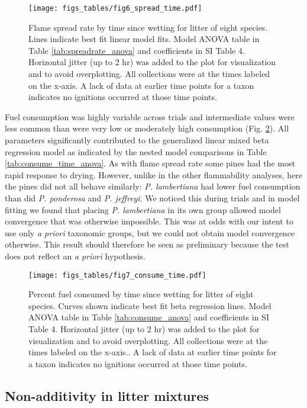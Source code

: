 \documentclass[letterpaper,12pt]{article}
\begin{document}
\begin{figure}[h]
  \centering
\texttt{[image: figs\_tables/fig6\_spread\_time.pdf]}
\caption{Flame spread rate by time since wetting for litter of eight species.
  Lines indicate best fit linear model fits. Model ANOVA table in Table
  \ref{tab:spreadrate_anova} and coefficients in SI Table 4. Horizontal jitter
  (up to 2 hr) was added to the plot for visualization and to avoid
  overplotting. All collections were at the times labeled on the x-axis. A lack
  of data at earlier time points for a taxon indicates no ignitions occurred at
  those time points.}
\label{fig:spread_time}
\end{figure}

Fuel consumption was highly variable across trials and intermediate values were
less common than were very low or moderately high consumption (Fig.
\ref{fig:consume_time}). All parameters significantly contributed to the
generalized linear mixed beta regression model as indicated by the nested model
comparisons in Table \ref{tab:consume_time_anova}. As with flame spread rate
some pines had the most rapid response to drying. However, unlike in the other
flammability analyses, here the pines did not all behave similarly: \emph{P.
  lambertiana} had lower fuel consumption than did \emph{P. ponderosa} and
\emph{P. jeffreyi}. We noticed this during trials and in model fitting we
found that placing \emph{P. lambertiana} in its own group allowed model
convergence that was otherwise impossible. This was at odds with our intent to
use only \emph{a priori} taxonomic groups, but we could not obtain model
convergence otherwise. This result should therefore be seen as preliminary
because the test does not reflect an \emph{a priori} hypothesis.


\begin{figure}[h]
  \centering
\texttt{[image: figs\_tables/fig7\_consume\_time.pdf]}
\caption{Percent fuel consumed by time since wetting for litter of eight
  species. Curves shown indicate best fit beta regression lines. Model ANOVA
  table in Table \ref{tab:consume_anova} and coefficients in SI Table 4.
  Horizontal jitter (up to 2 hr) was added to the plot for visualization and to
  avoid overplotting. All collections were at the times labeled on the x-axis..
  A lack of data at earlier time points for a taxon indicates no ignitions
  occurred at those time points.}
  \label{fig:consume_time}
\end{figure}


\subsection*{Non-additivity in  litter mixtures}
\end{document}
